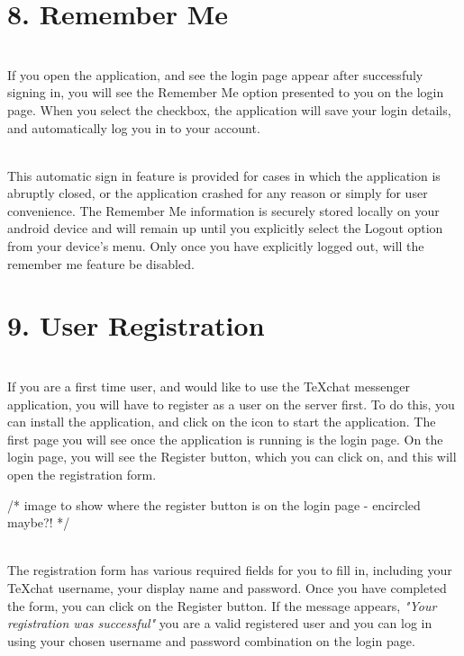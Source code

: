 \documentclass[29pt,a4paper]{moderncv}
\begin{document}
\newpage		
		\section*{8. Remember Me}
		\vspace{5mm}
		\\If you open the application, and see the login page appear after successfuly signing in, you will see the Remember Me option presented to you on the login page.  When you select the checkbox, the application will save your login details, and automatically log you in to your account.  
		
		\\This automatic sign in feature is provided for cases in which the application is abruptly closed, or the application crashed for any reason or simply for user convenience.  The Remember Me information is securely stored locally on your android device and will remain up until you explicitly select the Logout option from your device’s menu. Only once you have explicitly logged out, will the remember me feature be disabled.  
		\vspace{4mm}
		
\newpage

		\section*{9. User Registration}
		\vspace{5mm}
		\\If you are a first time user, and would like to use the TeXchat messenger application, you will have to register as a user on the server first.  To do this, you can install the application, and click on the icon to start the application.  The first page you will see once the application is running is the login page.  On the login page, you will see the Register button, which you can click on, and this will open the registration form.  
		
		/*  image to show where the register button is on the login page - encircled maybe?! */
		
		\\The registration form has various required fields for you to fill in, including your TeXchat username, your display name and password.  Once you have completed the form, you can click on the Register button.  If the message appears, \textit{"Your registration was successful"} you are a valid registered user and you can log in using your chosen username and password combination on the login page. 
		
\end{document}
